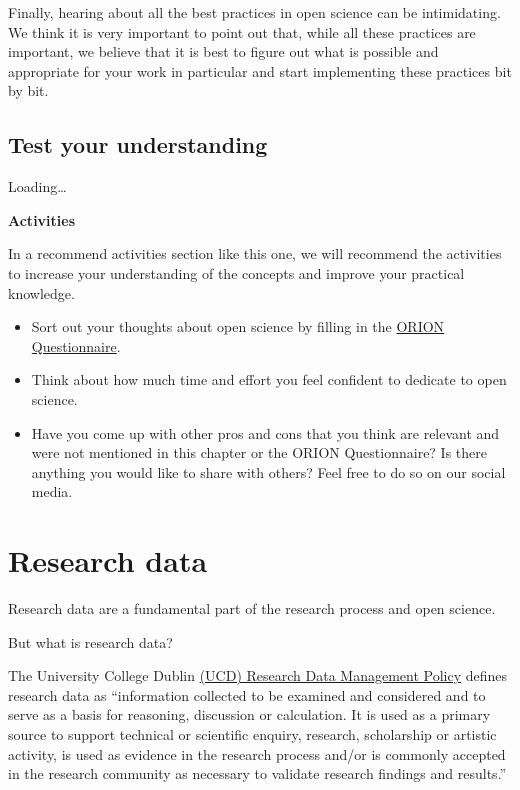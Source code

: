 \documentclass[
]{book}
\begin{document}
Finally, hearing about all the best practices in open science can be intimidating. We think it is very important to point out that, while all these practices are important, we believe that it is best to figure out what is possible and appropriate for your work in particular and start implementing these practices bit by bit.

\hypertarget{test-your-understanding-3}{%
\section{Test your understanding}\label{test-your-understanding-3}}

Loading\ldots{}

\textbf{Activities}

In a recommend activities section like this one, we will recommend the activities to increase your understanding of the concepts and improve your practical knowledge.

\begin{itemize}
\item
  Sort out your thoughts about open science by filling in the \href{https://www.orion-openscience.eu/public/2019-01/ORION_Questionaire_RPFO-CRECIM.pdf}{ORION Questionnaire}.
\item
  Think about how much time and effort you feel confident to dedicate to open science.
\item
  Have you come up with other pros and cons that you think are relevant and were not mentioned in this chapter or the ORION Questionnaire? Is there anything you would like to share with others? Feel free to do so on our social media.
\end{itemize}

\hypertarget{research-data}{%
\chapter{Research data}\label{research-data}}

Research data are a fundamental part of the research process and open science.

But what is research data?

The University College Dublin \href{https://hub.ucd.ie/usis/!W_HU_MENU.P_PUBLISH?p_tag=GD-DOCLAND\&ID=227}{(UCD) Research Data Management Policy} defines research data as ``information collected to be examined and considered and to serve as a basis for reasoning, discussion or calculation. It is used as a primary source to support technical or scientific enquiry, research, scholarship or artistic activity, is used as evidence in the research process and/or is commonly accepted in the research community as necessary to validate research findings and results.''
\end{document}

